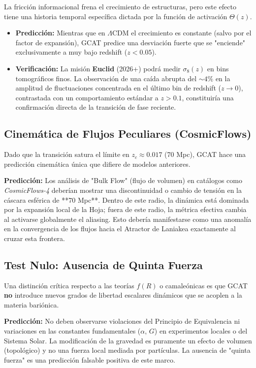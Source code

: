 \documentclass[12pt, a4paper]{article}
\theoremstyle{plain}
\theoremstyle{definition}
\begin{document}
La fricción informacional frena el crecimiento de estructuras, pero este efecto tiene una historia temporal específica dictada por la función de activación $\Theta(z)$.

\begin{itemize}
    \item \textbf{Predicción:} Mientras que en $\Lambda$CDM el crecimiento es constante (salvo por el factor de expansión), GCAT predice una desviación fuerte que se "enciende" exclusivamente a muy bajo redshift ($z < 0.05$).
    \item \textbf{Verificación:} La misión \textbf{Euclid} (2026+) podrá medir $\sigma_8(z)$ en bins tomográficos finos. La observación de una caída abrupta del $\sim 4\%$ en la amplitud de fluctuaciones concentrada en el último bin de redshift ($z \to 0$), contrastada con un comportamiento estándar a $z > 0.1$, constituiría una confirmación directa de la transición de fase reciente.
\end{itemize}

\subsection{Cinemática de Flujos Peculiares (CosmicFlows)}

Dado que la transición satura el límite en $z_c \approx 0.017$ (70 Mpc), GCAT hace una predicción cinemática única que difiere de modelos anteriores.

\textbf{Predicción:} Los análisis de "Bulk Flow" (flujo de volumen) en catálogos como \textit{CosmicFlows-4} deberían mostrar una discontinuidad o cambio de tensión en la cáscara esférica de **70 Mpc**. Dentro de este radio, la dinámica está dominada por la expansión local de la Hoja; fuera de este radio, la métrica efectiva cambia al activarse globalmente el aliasing. Esto debería manifestarse como una anomalía en la convergencia de los flujos hacia el Atractor de Laniakea exactamente al cruzar esta frontera.

\subsection{Test Nulo: Ausencia de Quinta Fuerza}

Una distinción crítica respecto a las teorías $f(R)$ o camaleónicas es que GCAT \textbf{no} introduce nuevos grados de libertad escalares dinámicos que se acoplen a la materia bariónica.

\textbf{Predicción:} No deben observarse violaciones del Principio de Equivalencia ni variaciones en las constantes fundamentales ($\alpha$, $G$) en experimentos locales o del Sistema Solar. La modificación de la gravedad es puramente un efecto de volumen (topológico) y no una fuerza local mediada por partículas. La ausencia de "quinta fuerza" es una predicción falsable positiva de este marco.
\end{document}
